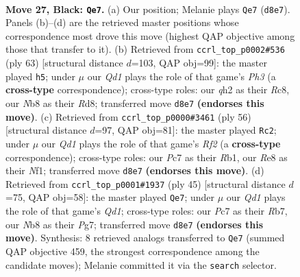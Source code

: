 \documentclass[11pt]{article}
\begin{document}
\clearpage

\begin{figure}[p]\centering
\begin{subfigure}{0.46\textwidth}\centering
\resizebox{\linewidth}{!}{%
\newchessgame
\chessboard[
  setfen={rn1qr1k1/2pn3p/1p2p1p1/p3Pp2/P2P1P1P/1R3NN1/2PK2PQ/7R b - - 0 27},
  showmover=false,
  pgfstyle=straightmove, color=movearrow, markmove={d8-e7}
]}
\caption{}
\end{subfigure}\hfill
\begin{subfigure}{0.46\textwidth}\centering
\resizebox{\linewidth}{!}{%
\newchessgame
\chessboard[
  setfen={2rr2k1/4qp2/pp1ppnpp/2n5/P1P1P3/1PN2PP1/3RN1KP/3QR3 b - - 11 32},
  showmover=false,
  pgfstyle=straightmove, color=movearrow, markmove={h6-h5}
]}
\caption{}
\end{subfigure}
\\[4pt]
\begin{subfigure}{0.46\textwidth}\centering
\resizebox{\linewidth}{!}{%
\newchessgame
\chessboard[
  setfen={1r4k1/q2nnpp1/p1ppr2p/4p3/PP2P3/1NQPP2P/5RPK/1R3N2 w - - 3 29},
  showmover=false,
  pgfstyle=straightmove, color=movearrow, markmove={f2-c2}
]}
\caption{}
\end{subfigure}\hfill
\begin{subfigure}{0.46\textwidth}\centering
\resizebox{\linewidth}{!}{%
\newchessgame
\chessboard[
  setfen={3q1r2/1r4pk/R2ppnnp/1pp1p3/4P3/3PPN1P/1PP1QNP1/R5K1 b - - 11 23},
  showmover=false,
  pgfstyle=straightmove, color=movearrow, markmove={d8-e7}
]}
\caption{}
\end{subfigure}
\caption{\textbf{Move 27, Black: \texttt{Qe7}.} (a) Our position; Melanie plays \texttt{Qe7} (\texttt{d8e7}). Panels (b)--(d) are the retrieved master positions whose correspondence most drove this move (highest QAP objective among those that transfer to it). (b) Retrieved from \texttt{ccrl\_top\_p0002\#536} (ply 63) [structural distance $d$=103, QAP obj=99]: the master played \texttt{h5}; under $\mu$ our \emph{Qd1} plays the role of that game's \emph{Ph3} (a \textbf{cross-type} correspondence); cross-type roles: our \emph{q}h2 as their \emph{R}c8, our \emph{N}b8 as their \emph{R}d8; transferred move \texttt{d8e7} \textbf{(endorses this move)}. (c) Retrieved from \texttt{ccrl\_top\_p0000\#3461} (ply 56) [structural distance $d$=97, QAP obj=81]: the master played \texttt{Rc2}; under $\mu$ our \emph{Qd1} plays the role of that game's \emph{Rf2} (a \textbf{cross-type} correspondence); cross-type roles: our \emph{P}c7 as their \emph{R}b1, our \emph{R}e8 as their \emph{N}f1; transferred move \texttt{d8e7} \textbf{(endorses this move)}. (d) Retrieved from \texttt{ccrl\_top\_p0001\#1937} (ply 45) [structural distance $d$=75, QAP obj=58]: the master played \texttt{Qe7}; under $\mu$ our \emph{Qd1} plays the role of that game's \emph{Qd1}; cross-type roles: our \emph{P}c7 as their \emph{R}b7, our \emph{N}b8 as their \emph{P}g7; transferred move \texttt{d8e7} \textbf{(endorses this move)}. Synthesis: 8 retrieved analogs transferred to \texttt{Qe7} (summed QAP objective 459, the strongest correspondence among the candidate moves); Melanie committed it via the \texttt{search} selector.}
\label{fig:thought-m53}
\end{figure}
\end{document}
